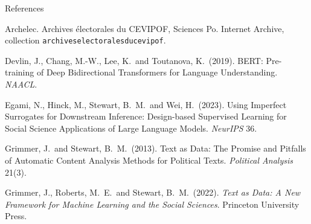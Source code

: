 \documentclass[svgnames,x11names,dvipsnames]{beamer}
\newcommand{\chg}[1]{{\bfseries #1}}
\renewcommand{\chg}[1]{#1}
\begin{document}
\begin{frame}{\chg{References}}
\vspace{0.1cm}
\raggedright
{\scriptsize
Archelec. Archives \'electorales du CEVIPOF, Sciences Po. Internet Archive, collection \texttt{archiveselectoralesducevipof}.

\vspace{0.1cm}
Devlin, J., Chang, M.-W., Lee, K.\ and Toutanova, K.\ (2019). BERT: Pre-training of Deep Bidirectional Transformers for Language Understanding. \textit{NAACL}.

\vspace{0.1cm}
Egami, N., Hinck, M., Stewart, B.\ M.\ and Wei, H.\ (2023). Using Imperfect Surrogates for Downstream Inference: Design-based Supervised Learning for Social Science Applications of Large Language Models. \textit{NeurIPS} 36.

\vspace{0.1cm}
Grimmer, J.\ and Stewart, B.\ M.\ (2013). Text as Data: The Promise and Pitfalls of Automatic Content Analysis Methods for Political Texts. \textit{Political Analysis} 21(3).

\vspace{0.1cm}
Grimmer, J., Roberts, M.\ E.\ and Stewart, B.\ M.\ (2022). \textit{Text as Data: A New Framework for Machine Learning and the Social Sciences}. Princeton University Press.
}
\end{frame}
\end{document}
